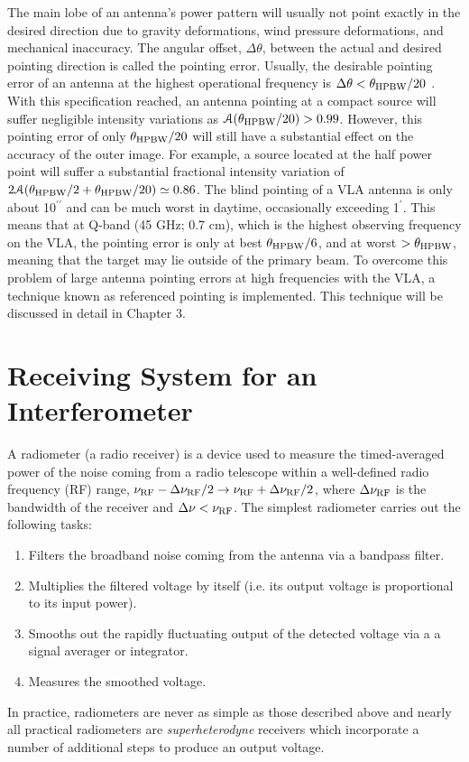 The main lobe of an antenna's power pattern will usually not point exactly in the desired direction due to gravity deformations, wind pressure deformations, and mechanical inaccuracy. The angular offset, $\Delta \theta$, between the actual and desired pointing direction is called the pointing error. Usually, the desirable pointing error of  an antenna at the highest operational frequency is $\Delta \theta < \theta _{\rm{HPBW}}/20$ \citep{taylor_1999}. With this specification reached, an antenna pointing at a compact source will suffer negligible intensity variations as $\mathcal{A}(\theta _{\rm{HPBW}}/20) > 0.99$. However, this pointing error of only $\theta _{\rm{HPBW}}/20$ will still have a substantial effect on the accuracy of the outer image. For example, a source located at the half power point will suffer a substantial fractional intensity variation of $2\mathcal{A}(\theta _{\rm{HPBW}}/2+\theta _{\rm{HPBW}}/20) \simeq 0.86$. The blind pointing of a VLA antenna is only about 10$^{\prime\prime}$ and can be much worst in daytime, occasionally exceeding 1$^{\prime}$. This means that at Q-band (45 GHz; 0.7 cm), which is the highest observing frequency on the VLA, the pointing error is only at best $\theta _{\rm{HPBW}}/6$, and at worst $>\theta _{\rm{HPBW}}$, meaning that the target may lie outside of the primary beam. To overcome this problem of large antenna pointing errors at high frequencies with the VLA, a technique known as referenced pointing is implemented. This technique will be discussed in detail in Chapter 3. 

\section{Receiving System for an Interferometer}\label{sec:2}
A radiometer (a radio receiver) is a device  used to measure the  timed-averaged power of the noise coming from a radio telescope within a  well-defined radio frequency (RF) range, $\nu _{\rm{RF}}-\Delta \nu _{\rm{RF}}/2 \rightarrow \nu _{\rm{RF}}+\Delta \nu _{\rm{RF}}/2$, where $\Delta \nu _{\rm{RF}}$ is the bandwidth of the receiver and $\Delta \nu < \nu _{\rm{RF}}$. 
The simplest radiometer carries out the following tasks:
\begin{enumerate}
\item Filters the broadband noise coming from the antenna via a bandpass filter.
\item Multiplies the filtered voltage by itself (i.e. its output voltage is proportional to its input power).
\item Smooths out the rapidly fluctuating output of the detected voltage via a a signal averager or integrator.
\item Measures the smoothed voltage.
\end{enumerate}
In practice, radiometers are never as simple as those described above and nearly all practical radiometers are \textit{superheterodyne} receivers which incorporate a number of additional steps to produce an output voltage.

